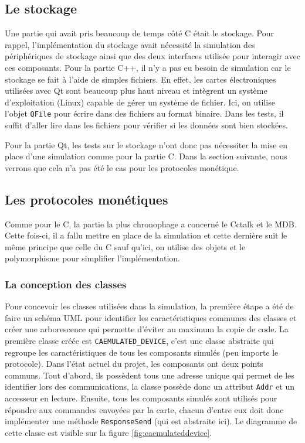 \documentclass[a4paper]{article}
\begin{document}
\subsection{Le stockage}%

Une partie qui avait pris beaucoup de temps côté C était le stockage. Pour
rappel, l'implémentation du stockage avait nécessité la simulation des
périphériques de stockage ainsi que des deux interfaces utilisée pour interagir
avec ces composants. Pour la partie C++, il n'y a pas eu besoin de simulation car
le stockage se fait à l'aide de simples fichiers. En effet, les cartes
électroniques utilisées avec Qt sont beaucoup plus haut niveau et intègrent un
système d'exploitation (Linux) capable de gérer un système de fichier. Ici, on
utilise l'objet \verb|QFile| pour écrire dans des fichiers au format binaire.
Dans les tests, il suffit d'aller lire dans les fichiers pour vérifier si les données
sont bien stockées.

Pour la partie Qt, les tests sur le stockage n'ont donc pas nécessiter la mise
en place d'une simulation comme pour la partie C. Dans la section suivante, nous
verrons que cela n'a pas été le cas pour les protocoles monétique.
\subsection{Les protocoles monétiques}%

Comme pour le C, la partie la plus chronophage a concerné le Cctalk et le MDB.
Cette fois-ci, il a fallu mettre en place de la simulation et cette dernière
suit le même principe que celle du C sauf qu'ici, on utilise des objets et le
polymorphisme pour simplifier l'implémentation.

\subsubsection{La conception des classes}

Pour concevoir les classes utilisées dans la simulation, la première étape a été
de faire un schéma UML pour identifier les caractéristiques communes des classes
et créer une arborescence qui permette d'éviter au maximum la copie de code. La
première classe créée est \verb|CAEMULATED_DEVICE|, c'est une classe abstraite
qui regroupe les caractéristiques de tous les composants simulés (peu importe le
protocole). Dans l'état actuel du projet, les composants ont deux points
communs. Tout d'abord, ils possèdent tous une adresse unique qui permet de les
identifier lors des communications, la classe possède donc un attribut
\verb|Addr| et un accesseur en lecture. Ensuite, tous les composants simulés
sont utilisés pour répondre aux commandes envoyées par la carte, chacun d'entre
eux doit donc implémenter une méthode \verb|ResponseSend| (qui est abstraite
ici). Le diagramme de cette classe est visible sur la figure
\ref{fig:caemulateddevice}.
\end{document}
